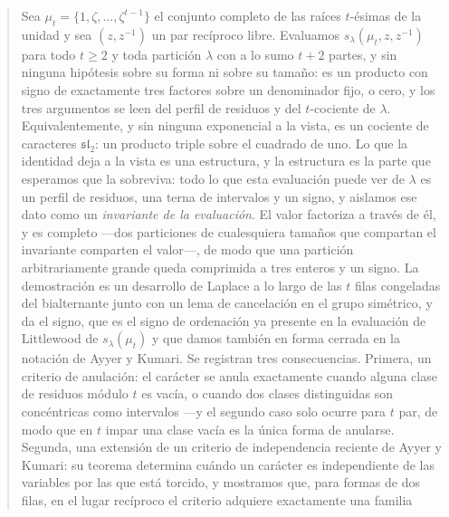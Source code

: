 \documentclass[11pt,reqno]{amsart}
\theoremstyle{plain}
\theoremstyle{definition}
\newcommand{\zt}{\mu_t}
\begin{document}
\begin{abstract}
\ifdefined\LONGABS
Sea $\zt=\{1,\zeta,\dots,\zeta^{t-1}\}$ el conjunto completo de las raíces $t$-ésimas de la unidad y
sea $(z,z^{-1})$ un par recíproco libre. Evaluamos $s_\lambda(\zt,z,z^{-1})$ para todo $t\ge2$ y toda
partición $\lambda$ con a lo sumo $t+2$ partes, y sin ninguna hipótesis sobre su forma ni sobre su
tamaño: es un producto con signo de
exactamente tres factores sobre un denominador fijo, o cero, y los tres argumentos se leen del
perfil de residuos y del $t$-cociente de $\lambda$. Equivalentemente, y sin ninguna exponencial a la vista, es un cociente de
caracteres $\mathfrak{sl}_2$: un producto triple sobre el cuadrado de uno. Lo que la identidad deja a
la vista es una estructura, y la estructura es la parte que esperamos que la sobreviva: todo lo que
esta evaluación puede ver de $\lambda$ es un perfil de residuos, una terna de intervalos y un signo, y
aislamos ese dato como un \emph{invariante de la evaluación}. El valor factoriza a través de él, y es
completo ---dos particiones de cualesquiera tamaños que compartan el invariante comparten el valor---,
de modo que una partición arbitrariamente grande queda comprimida a tres enteros y un signo.
La demostración es un
desarrollo de Laplace a lo largo de las $t$ filas
congeladas del bialternante junto con un lema de cancelación en el grupo simétrico, y da el signo,
que es el signo de ordenación ya presente en la evaluación de Littlewood de $s_\lambda(\zt)$ y que
damos también en forma cerrada en la notación de Ayyer y Kumari. Se
registran tres consecuencias. Primera, un criterio de anulación: el carácter se anula exactamente
cuando alguna clase de residuos módulo $t$ es vacía, o cuando dos clases distinguidas son
concéntricas como intervalos ---y el segundo caso solo ocurre para $t$ par, de modo que en $t$ impar
una clase vacía es la única forma de anularse. Segunda, una extensión de un criterio de independencia reciente de
Ayyer y Kumari: su teorema determina cuándo un carácter es independiente de las variables por las que
está torcido, y mostramos que, para formas de dos filas, en el lugar recíproco el criterio adquiere exactamente una familia

\end{abstract}
\end{document}
